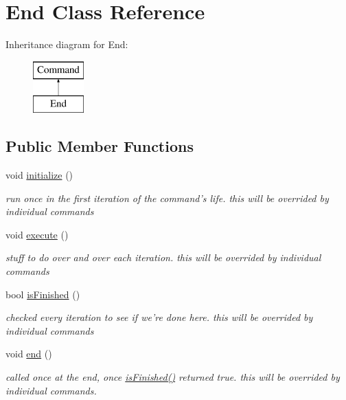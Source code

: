 \hypertarget{classEnd}{\section{End Class Reference}
\label{classEnd}
}
Inheritance diagram for End\-:\begin{figure}[H]
\begin{center}
\leavevmode
\includegraphics[height=2.000000cm]{classEnd}
\end{center}
\end{figure}
\subsection*{Public Member Functions}
\begin{DoxyCompactItemize}
\item 
\hypertarget{classEnd_a0f844207902db51f8992c2a1f23a47d9}{void \hyperlink{classEnd_a0f844207902db51f8992c2a1f23a47d9}{initialize} ()}\label{classEnd_a0f844207902db51f8992c2a1f23a47d9}

\begin{DoxyCompactList}\small\item\em run once in the first iteration of the command's life. this will be overrided by individual commands \end{DoxyCompactList}\item 
\hypertarget{classEnd_a45a7411a23472e3297b48b6760a0d331}{void \hyperlink{classEnd_a45a7411a23472e3297b48b6760a0d331}{execute} ()}\label{classEnd_a45a7411a23472e3297b48b6760a0d331}

\begin{DoxyCompactList}\small\item\em stuff to do over and over each iteration. this will be overrided by individual commands \end{DoxyCompactList}\item 
bool \hyperlink{classEnd_a2e5c37f16b83f9e354b34ee3ed63aae8}{is\-Finished} ()
\begin{DoxyCompactList}\small\item\em checked every iteration to see if we're done here. this will be overrided by individual commands \end{DoxyCompactList}\item 
\hypertarget{classEnd_a84e2ceb14d9465c580c162a26fa3e6de}{void \hyperlink{classEnd_a84e2ceb14d9465c580c162a26fa3e6de}{end} ()}\label{classEnd_a84e2ceb14d9465c580c162a26fa3e6de}

\begin{DoxyCompactList}\small\item\em called once at the end, once \hyperlink{classEnd_a2e5c37f16b83f9e354b34ee3ed63aae8}{is\-Finished()} returned true. this will be overrided by individual commands. \end{DoxyCompactList}\end{DoxyCompactItemize}
